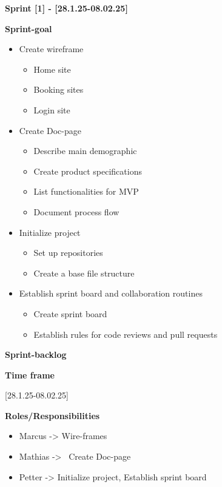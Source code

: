 \textbf{Sprint [1] - [28.1.25-08.02.25]} 

\textbf{Sprint-goal} 

\begin{itemize}
Project startup
    \item Create wireframe
    \begin{itemize}
        \item Home site
        \item Booking sites
        \item Login site
    \end{itemize}
    \item Create Doc-page
    \begin{itemize}
        \item Describe main demographic
        \item Create product specifications
        \item List functionalities for MVP
        \item Document process flow
    \end{itemize}
    \item Initialize project
    \begin{itemize}
        \item Set up repositories
        \item Create a base file structure
    \end{itemize}
    \item Establish sprint board and collaboration routines
    \begin{itemize}
        \item Create sprint board
        \item Establish rules for code reviews and pull requests
    \end{itemize}
\end{itemize}

\textbf{Sprint-backlog} 


\textbf{Time frame} 

[28.1.25-08.02.25] 

\textbf{Roles/Responsibilities }

\begin{itemize}
    \item Marcus -> Wire-frames

    \item Mathias ->  Create Doc-page

    \item Petter -> Initialize project, Establish sprint board
\end{itemize}

